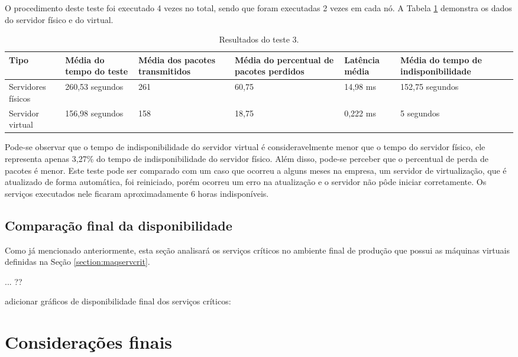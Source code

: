 O procedimento deste teste foi executado 4 vezes no total, sendo que foram executadas 2 vezes em cada nó. A Tabela \ref{tab:teste3resultados}
demonstra os dados do servidor físico e do virtual.

\begin{table}[h!]
\caption{Resultados do teste 3.}
\label{tab:teste3resultados}
\begin{center}
\begin{tabular}{|l|p{2.2cm}|p{2.5cm}|p{2.5cm}|p{1.5cm}|p{3cm}|}\hline
\textbf{Tipo} & \textbf{Média do tempo do teste} & \textbf{Média dos pacotes transmitidos} & \textbf{Média do percentual de pacotes perdidos} & \textbf{Latência média} & \textbf{Média do tempo de indisponibilidade} \\\hline
Servidores físicos & 260,53 segundos & 261 & 60,75 & 14,98 ms & 152,75 segundos \\\hline
Servidor virtual & 156,98 segundos & 158 & 18,75 & 0,222 ms & 5 segundos \\\hline
\end{tabular}
\end{center}
\end{table}

Pode-se observar que o tempo de indisponibilidade do servidor virtual é consideravelmente menor que o tempo do servidor físico, ele representa 
apenas 3,27\% do tempo de indisponibilidade do servidor físico. Além disso, pode-se perceber que o percentual de perda de pacotes é menor.
Este teste pode ser comparado com um caso que ocorreu a alguns meses na empresa, um servidor de virtualização, que é atualizado de forma automática,
foi reiniciado, porém ocorreu um erro na atualização e o servidor não pôde iniciar corretamente. Os serviços executados nele ficaram 
aproximadamente 6 horas indisponíveis.

\subsection{Comparação final da disponibilidade}
\label{section:comparacaofinal}

Como já mencionado anteriormente, esta seção analisará os serviços críticos no ambiente final de produção que possui as máquinas virtuais
definidas na Seção \ref{section:maqservcrit}. 

... ??

adicionar gráficos de disponibilidade final dos serviços críticos:



\section{Considerações finais}
